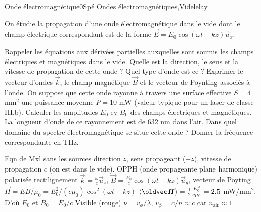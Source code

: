 \begin{exercise}{Onde électromagnétique}{0}{Spé}
{Ondes électromagnétiques,Vide}{lelay}

On étudie la propagation d'une onde électromagnétique dans le vide dont le champ électrique correspondant est de la forme $\vec{E} = E_0\cos(\omega t - kz)\vec{u}_x$.
\begin{questions}
    \questioncours Rappeler les équations aux dérivées partielles auxquelles sont soumis les champs électriques et magnétiques dans le vide.
    \question Quelle est la direction, le sens et la vitesse de propagation de cette onde ? Quel type d'onde est-ce ? 
    \question Exprimer le vecteur d'ondes $\vec{k}$, le champ magnétique $\vec{B}$ et le vecteur de Poynting associés à l'onde.
    \question On suppose que cette onde rayonne à travers une surface effective $S = 4$ mm$^2$ une puissance moyenne $P = 10$ mW (valeur typique pour un laser de classe III.b). Calculer les amplitudes $E_0$ ey $B_0$ des champs électriques et magnétiques.
    \question La longueur d'onde de ce rayonnement est de 632 nm dans l'air. Dans quel domaine du spectre électromagnétique se situe cette onde ?
    \question Donner la fréquence correspondante en THz.
\end{questions}

\end{exercise}

\begin{solution}

\begin{questions}
    \questioncours Eqn de Mxl sans les sources
    \question direction $z$, sens propageant ($+z$), vitesse de propagation $c$ (on est dans le vide). OPPH (onde propageante plane harmonique) polarisée rectilignement
    \question $\vec{k} = \frac{\omega}{c}\vec{u}_z$, $\vec{B} = \frac{E_0}{c}\cos(\omega t - kz) \vec{u}_y$, vecteur de Poyting $\vec{\Pi} = EB/\mu_0 = E_0^2/(c\mu_0) \cos^2(\omega t - kz)$
    \question $\ev{\vec{\Pi}} = \frac12 \frac{E_0^2}{c\mu_0} = 2.5$ mW/mm$^2$. D'où $E_0$ et $B_0  =E_0 / c$
    \question Visible (rouge)
    \question $\nu = v_\phi / \lambda$, $v_\phi = c/n \approx c$ car $n_\text{air} \approx 1$
\end{questions}
\end{solution}